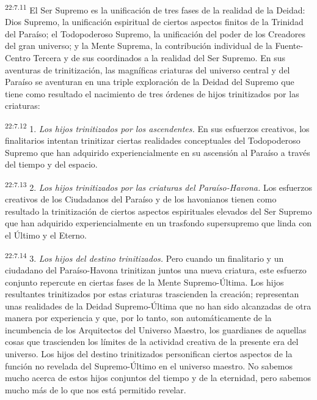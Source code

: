 \par
\textsuperscript{22:7.11} El Ser Supremo es la unificación de tres fases de la realidad de la Deidad: Dios Supremo, la unificación espiritual de ciertos aspectos finitos de la Trinidad del Paraíso; el Todopoderoso Supremo, la unificación del poder de los Creadores del gran universo; y la Mente Suprema, la contribución individual de la Fuente-Centro Tercera y de sus coordinados a la realidad del Ser Supremo. En sus aventuras de trinitización, las magníficas criaturas del universo central y del Paraíso se aventuran en una triple exploración de la Deidad del Supremo que tiene como resultado el nacimiento de tres órdenes de hijos trinitizados por las criaturas:

\par
\textsuperscript{22:7.12} 1. \textit{Los hijos trinitizados por los ascendentes.} En sus esfuerzos creativos, los finalitarios intentan trinitizar ciertas realidades conceptuales del Todopoderoso Supremo que han adquirido experiencialmente en su ascensión al Paraíso a través del tiempo y del espacio.

\par
\textsuperscript{22:7.13} 2. \textit{Los hijos trinitizados por las criaturas del Paraíso-Havona.} Los esfuerzos creativos de los Ciudadanos del Paraíso y de los havonianos tienen como resultado la trinitización de ciertos aspectos espirituales elevados del Ser Supremo que han adquirido experiencialmente en un trasfondo supersupremo que linda con el Último y el Eterno.

\par
\textsuperscript{22:7.14} 3. \textit{Los hijos del destino trinitizados.} Pero cuando un finalitario y un ciudadano del Paraíso-Havona trinitizan juntos una nueva criatura, este esfuerzo conjunto repercute en ciertas fases de la Mente Supremo-Última. Los hijos resultantes trinitizados por estas criaturas trascienden la creación; representan unas realidades de la Deidad Supremo-Última que no han sido alcanzadas de otra manera por experiencia y que, por lo tanto, son automáticamente de la incumbencia de los Arquitectos del Universo Maestro, los guardianes de aquellas cosas que trascienden los límites de la actividad creativa de la presente era del universo. Los hijos del destino trinitizados personifican ciertos aspectos de la función no revelada del Supremo-Último en el universo maestro. No sabemos mucho acerca de estos hijos conjuntos del tiempo y de la eternidad, pero sabemos mucho más de lo que nos está permitido revelar.

